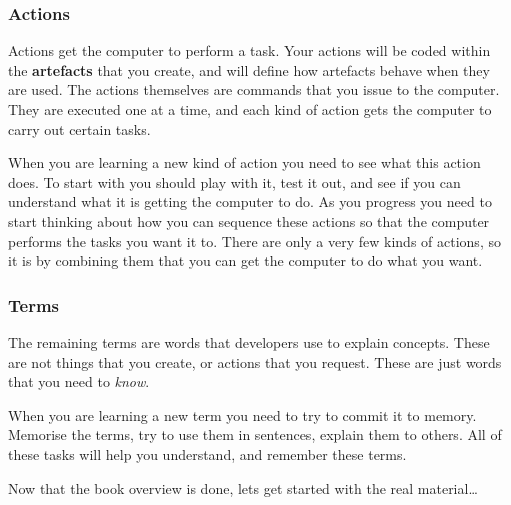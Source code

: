 
\subsubsection{Actions} %
\label{ssub:actions}

Actions get the computer to perform a task. Your actions will be coded within the \textbf{artefacts} that you create, and will define how artefacts behave when they are used. The actions themselves are commands that you issue to the computer. They are executed one at a time, and each kind of action gets the computer to carry out certain tasks.

When you are learning a new kind of action you need to see what this action does. To start with you should play with it, test it out, and see if you can understand what it is getting the computer to do. As you progress you need to start thinking about how you can sequence these actions so that the computer performs the tasks you want it to. There are only a very few kinds of actions, so it is by combining them that you can get the computer to do what you want. 


\subsubsection{Terms} %
\label{ssub:terms}

The remaining terms are words that developers use to explain concepts. These are not things that you create, or actions that you request. These are just words that you need to \emph{know}.

When you are learning a new term you need to try to commit it to memory. Memorise the terms, try to use them in sentences, explain them to others. All of these tasks will help you understand, and remember these terms.


\bigskip

Now that the book overview is done, lets get started with the real material\ldots

